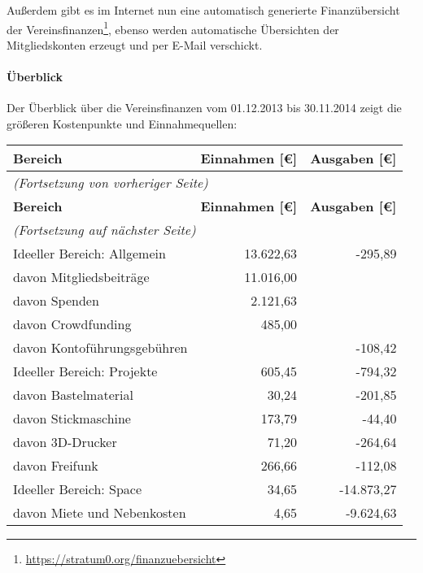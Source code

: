 \documentclass[a4paper,12pt]{scrartcl}
\begin{document}
Außerdem gibt es im Internet nun eine automatisch generierte Finanzübersicht der
Vereinsfinanzen\footnote{\url{https://stratum0.org/finanzuebersicht}}, ebenso
werden automatische Übersichten der Mitgliedskonten erzeugt und per E-Mail
verschickt.

\paragraph{Überblick}
Der Überblick über die Vereinsfinanzen vom 01.12.2013 bis 30.11.2014 zeigt die
größeren Kostenpunkte und Einnahmequellen:

\enlargethispage{1\baselineskip}
\begin{longtable}{|l|r|r|}
  \hline
  \textbf{Bereich} & \textbf{Einnahmen [€]} & \textbf{Ausgaben [€]} \\
  \hline
  \endfirsthead
  \multicolumn{3}{l}{\emph{(Fortsetzung von vorheriger Seite)}} \\
  \hline
  \textbf{Bereich} & \textbf{Einnahmen [€]} & \textbf{Ausgaben [€]} \\
  \hline
  \endhead
  \multicolumn{3}{l}{\emph{(Fortsetzung auf nächster Seite)}} \\
  \endfoot
  \endlastfoot
  Ideeller Bereich: Allgemein       & 13{.}622{,}63 &      -295{,}89 \\
  \quad davon Mitgliedsbeiträge     & 11{.}016{,}00 &                \\
  \quad davon Spenden               &  2{.}121{,}63 &                \\
  \quad davon Crowdfunding          &      485{,}00 &                \\
  \quad davon Kontoführungsgebühren &               &      -108{,}42 \\
  \hline
  Ideeller Bereich: Projekte        &      605{,}45 &      -794{,}32 \\
  \quad davon Bastelmaterial        &       30{,}24 &      -201{,}85 \\
  \quad davon Stickmaschine         &      173{,}79 &       -44{,}40 \\
  \quad davon 3D-Drucker            &       71{,}20 &      -264{,}64 \\
  \quad davon Freifunk              &      266{,}66 &      -112{,}08 \\
  \hline
  Ideeller Bereich: Space           &       34{,}65 & -14{.}873{,}27 \\
  \quad davon Miete und Nebenkosten &        4{,}65 &  -9{.}624{,}63 \\

\end{longtable}
\end{document}
